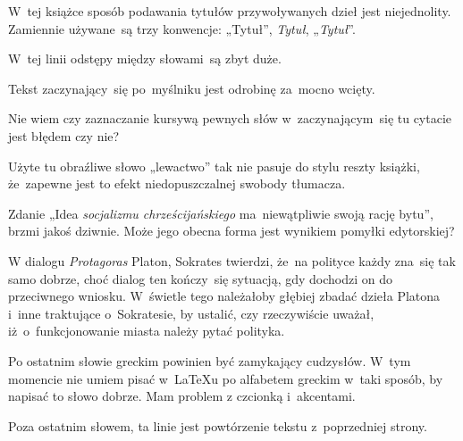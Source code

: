 \documentclass[a4paper,11pt]{article}
\begin{document}

\start W~tej książce sposób podawania tytułów przywoływanych dzieł
jest niejednolity. Zamiennie używane~są trzy konwencje: „Tytuł”,
\emph{Tytuł}, „\emph{Tytuł}”.

\vspace{\spaceFour}


\start {} W~tej linii odstępy między słowami~są zbyt
duże.

\vspace{\spaceFour}


\start {} Tekst zaczynający~się po~myślniku jest odrobinę
za~mocno wcięty.

\vspace{\spaceFour}


\start {} Nie wiem czy zaznaczanie kursywą pewnych słów
w~zaczynającym~się tu cytacie jest błędem czy nie?

\vspace{\spaceFour}


\start {} Użyte tu obraźliwe słowo „lewactwo” tak nie
pasuje do stylu reszty książki, że~zapewne jest to efekt
niedopuszczalnej swobody tłumacza.

\vspace{\spaceFour}


\start {} Zdanie „Idea \emph{socjalizmu
  chrześcijańskiego} ma~niewątpliwie swoją rację bytu”, brzmi jakoś
dziwnie. Może jego obecna forma jest wynikiem pomyłki edytorskiej?

\vspace{\spaceFour}


\start {} W dialogu \emph{Protagoras} Platon, Sokrates
twierdzi, że~na polityce każdy zna~się tak samo dobrze, choć dialog
ten kończy~się sytuacją, gdy dochodzi on do przeciwnego wniosku.
W~świetle tego należałoby głębiej zbadać dzieła Platona i~inne
traktujące o~Sokratesie, by ustalić, czy rzeczywiście uważał,
iż~o~funkcjonowanie miasta należy pytać polityka.

\vspace{\spaceFour}


\start {} Po ostatnim słowie greckim powinien być
zamykający cudzysłów. W~tym momencie nie umiem pisać w~\LaTeX u po
alfabetem greckim w~taki sposób, by napisać to słowo dobrze. Mam
problem z czcionką i~akcentami.

\vspace{\spaceFour}


\start {} Poza ostatnim słowem, ta linie jest powtórzenie
tekstu z~poprzedniej strony.
\end{document}
